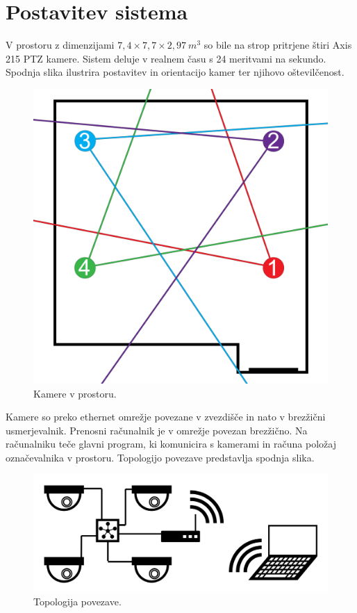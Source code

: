 \documentclass[a4paper, 12pt]{book}
\begin{document}
\section{Postavitev sistema}
V prostoru z dimenzijami $7,4 \times 7,7 \times 2,97 \ m^3$ so bile na strop pritrjene štiri Axis 215 PTZ kamere. Sistem deluje v realnem času s 24 meritvami na sekundo. Spodnja slika ilustrira postavitev in orientacijo kamer ter njihovo oštevilčenost.

\begin{figure}[H]
\centering
\includegraphics[scale=0.5]{room_setting.png}
\caption{Kamere v prostoru.}
\end{figure}

Kamere so preko ethernet omrežje povezane v zvezdišče in nato v brezžični usmerjevalnik. Prenosni računalnik je v omrežje povezan brezžično. Na računalniku teče glavni program, ki komunicira s kamerami in računa položaj označevalnika v prostoru. Topologijo povezave predstavlja spodnja slika.
\begin{figure}[H]
\centering
\includegraphics[width=\textwidth,height=\textheight,keepaspectratio]{topology.png}
\caption{Topologija povezave.}
\end{figure}
\end{document}
